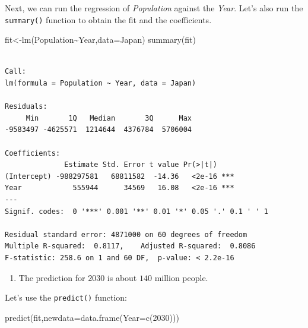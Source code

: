 \documentclass[
  letterpaper,
  DIV=11,
  numbers=noendperiod]{scrreprt}
\newenvironment{Shaded}{\begin{snugshade}}{\end{snugshade}}
\newcommand{\AttributeTok}[1]{\textcolor[rgb]{0.40,0.45,0.13}{#1}}
\newcommand{\DecValTok}[1]{\textcolor[rgb]{0.68,0.00,0.00}{#1}}
\newcommand{\FunctionTok}[1]{\textcolor[rgb]{0.28,0.35,0.67}{#1}}
\newcommand{\NormalTok}[1]{\textcolor[rgb]{0.00,0.23,0.31}{#1}}
\newcommand{\OtherTok}[1]{\textcolor[rgb]{0.00,0.23,0.31}{#1}}
\newcommand{\SpecialCharTok}[1]{\textcolor[rgb]{0.37,0.37,0.37}{#1}}
\providecommand{\tightlist}{%
  \setlength{\itemsep}{0pt}\setlength{\parskip}{0pt}}\usepackage{longtable,booktabs,array}
\begin{document}
Next, we can run the regression of \emph{Population} against the
\emph{Year}. Let's also run the \texttt{summary()} function to obtain
the fit and the coefficients.

\begin{Shaded}
\begin{Highlighting}[numbers=left,,]
\NormalTok{fit}\OtherTok{\textless{}{-}}\FunctionTok{lm}\NormalTok{(Population}\SpecialCharTok{\textasciitilde{}}\NormalTok{Year,}\AttributeTok{data=}\NormalTok{Japan)}
\FunctionTok{summary}\NormalTok{(fit)}
\end{Highlighting}
\end{Shaded}

\begin{verbatim}

Call:
lm(formula = Population ~ Year, data = Japan)

Residuals:
     Min       1Q   Median       3Q      Max 
-9583497 -4625571  1214644  4376784  5706004 

Coefficients:
              Estimate Std. Error t value Pr(>|t|)    
(Intercept) -988297581   68811582  -14.36   <2e-16 ***
Year            555944      34569   16.08   <2e-16 ***
---
Signif. codes:  0 '***' 0.001 '**' 0.01 '*' 0.05 '.' 0.1 ' ' 1

Residual standard error: 4871000 on 60 degrees of freedom
Multiple R-squared:  0.8117,    Adjusted R-squared:  0.8086 
F-statistic: 258.6 on 1 and 60 DF,  p-value: < 2.2e-16
\end{verbatim}

\begin{blackbox}

\begin{enumerate}
\def\labelenumi{\arabic{enumi}.}
\setcounter{enumi}{1}
\tightlist
\item
  The prediction for \(2030\) is about \(140\) million people.
\end{enumerate}

\end{blackbox}

Let's use the \texttt{predict()} function:

\begin{Shaded}
\begin{Highlighting}[numbers=left,,]
\FunctionTok{predict}\NormalTok{(fit,}\AttributeTok{newdata=}\FunctionTok{data.frame}\NormalTok{(}\AttributeTok{Year=}\FunctionTok{c}\NormalTok{(}\DecValTok{2030}\NormalTok{)))}
\end{Highlighting}
\end{Shaded}
\end{document}
